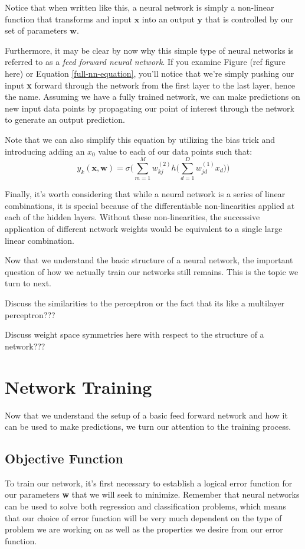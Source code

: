 Notice that when written like this, a neural network is simply a non-linear function that transforms and input $\textbf{x}$ into an output $\textbf{y}$ that is controlled by our set of parameters $\textbf{w}$.

Furthermore, it may be clear by now why this simple type of neural networks is referred to as a \textit{feed forward neural network}. If you examine Figure (ref figure here) or Equation \ref{full-nn-equation}, you'll notice that we're simply pushing our input \textbf{x} forward through the network from the first layer to the last layer, hence the name. Assuming we have a fully trained network, we can make predictions on new input data points by propagating our point of interest through the network to generate an output prediction.

Note that we can also simplify this equation by utilizing the bias trick and introducing adding an $x_{0}$ value to each of our data points such that:
\begin{equation*}
	y_{k}(\textbf{x}, \textbf{w}) = \sigma\bigg(\sum_{m=1}^{M}w_{kj}^{(2)} h\bigg(\sum_{d=1}^{D}w_{jd}^{(1)}x_{d}\bigg)\bigg)
\end{equation*}

Finally, it's worth considering that while a neural network is a series of linear combinations, it is special because of the differentiable non-linearities applied at each of the hidden layers. Without these non-linearities, the successive application of different network weights would be equivalent to a single large linear combination.

Now that we understand the basic structure of a neural network, the important question of how we actually train our networks still remains. This is the topic we turn to next.

Discuss the similarities to the perceptron or the fact that its like a multilayer perceptron???

Discuss weight space symmetries here with respect to the structure of a network???

\section{Network Training}
Now that we understand the setup of a basic feed forward network and how it can be used to make predictions, we turn our attention to the training process.

\subsection{Objective Function}
To train our network, it's first necessary to establish a logical error function for our parameters \textbf{w} that we will seek to minimize. Remember that neural networks can be used to solve both regression and classification problems, which means that our choice of error function will be very much dependent on the type of problem we are working on as well as the properties we desire from our error function.

